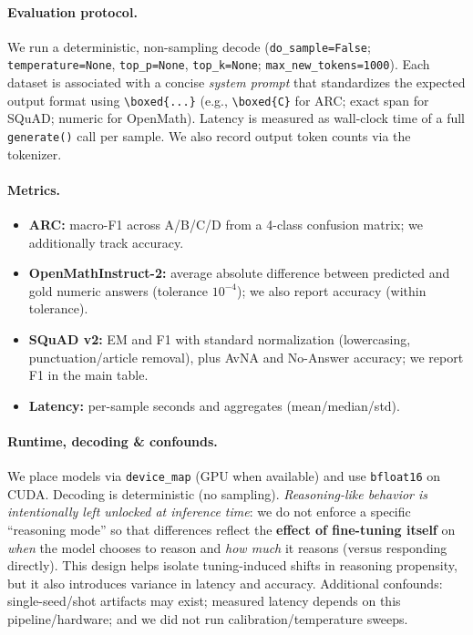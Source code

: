 \documentclass[11pt,a4paper]{article}
\begin{document}
\paragraph{Evaluation protocol.}
We run a deterministic, non-sampling decode (\texttt{do\_sample=False}; \texttt{temperature=None}, \texttt{top\_p=None}, \texttt{top\_k=None}; \texttt{max\_new\_tokens=1000}). Each dataset is associated with a concise \emph{system prompt} that standardizes the expected output format using \verb|\boxed{...}| (e.g., \verb|\boxed{C}| for ARC; exact span for SQuAD; numeric for OpenMath). Latency is measured as wall-clock time of a full \texttt{generate()} call per sample. We also record output token counts via the tokenizer.

\paragraph{Metrics.}
\begin{itemize}
  \item \textbf{ARC:} macro-F1 across A/B/C/D from a 4-class confusion matrix; we additionally track accuracy.
  \item \textbf{OpenMathInstruct-2:} average absolute difference between predicted and gold numeric answers (tolerance $10^{-4}$); we also report accuracy (within tolerance).
  \item \textbf{SQuAD v2:} EM and F1 with standard normalization (lowercasing, punctuation/article removal), plus AvNA and No-Answer accuracy; we report F1 in the main table.
  \item \textbf{Latency:} per-sample seconds and aggregates (mean/median/std).
\end{itemize}

\paragraph{Runtime, decoding \& confounds.}
We place models via \texttt{device\_map} (GPU when available) and use \texttt{bfloat16} on CUDA. Decoding is deterministic (no sampling). \emph{Reasoning-like behavior is intentionally left unlocked at inference time}: we do not enforce a specific “reasoning mode” so that differences reflect the \textbf{effect of fine-tuning itself} on \emph{when} the model chooses to reason and \emph{how much} it reasons (versus responding directly). This design helps isolate tuning-induced shifts in reasoning propensity, but it also introduces variance in latency and accuracy. Additional confounds: single-seed/shot artifacts may exist; measured latency depends on this pipeline/hardware; and we did not run calibration/temperature sweeps.
\end{document}

